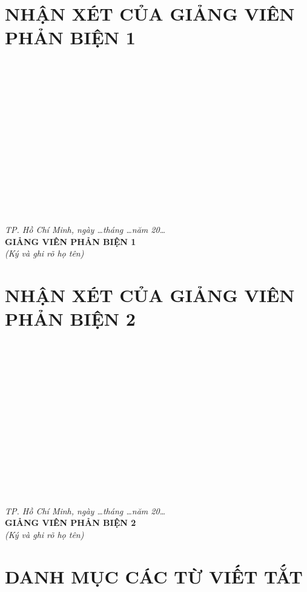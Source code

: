 \documentclass[a4paper,12pt]{extreport}
\newcommand{\dotline}{
    \noindent\makebox[\linewidth]{\dotfill}\\[10pt]
}
\begin{document}
\newpage
\chapter*{NHẬN XÉT CỦA GIẢNG VIÊN PHẢN BIỆN 1}
\thispagestyle{frontmatter}
\dotline \dotline \dotline \dotline \dotline
\dotline \dotline \dotline \dotline \dotline
\dotline \dotline \dotline 
\vspace{0.5cm}
\begin{flushright}
    \textit{TP. Hồ Chí Minh, ngày \dots tháng \dots năm 20\dots}\\
    \textbf{GIẢNG VIÊN PHẢN BIỆN 1}\\
    \textit{(Ký và ghi rõ họ tên)}\\
    \vspace{1.5cm}
\end{flushright}

\newpage
\chapter*{NHẬN XÉT CỦA GIẢNG VIÊN PHẢN BIỆN 2}
\thispagestyle{frontmatter}
\dotline \dotline \dotline \dotline \dotline
\dotline \dotline \dotline \dotline \dotline
\dotline \dotline \dotline 
\vspace{0.5cm}
\begin{flushright}
    \textit{TP. Hồ Chí Minh, ngày \dots tháng \dots năm 20\dots}\\
    \textbf{GIẢNG VIÊN PHẢN BIỆN 2}\\
    \textit{(Ký và ghi rõ họ tên)}\\
    \vspace{1.5cm}
\end{flushright}

\newpage
{}
\tableofcontents
\thispagestyle{frontmatter}

\newpage
{}
\listoffigures
\thispagestyle{frontmatter}

\newpage
{}
\listoftables
\thispagestyle{frontmatter}

\newpage
\chapter*{DANH MỤC CÁC TỪ VIẾT TẮT}
\thispagestyle{frontmatter}
\end{document}

